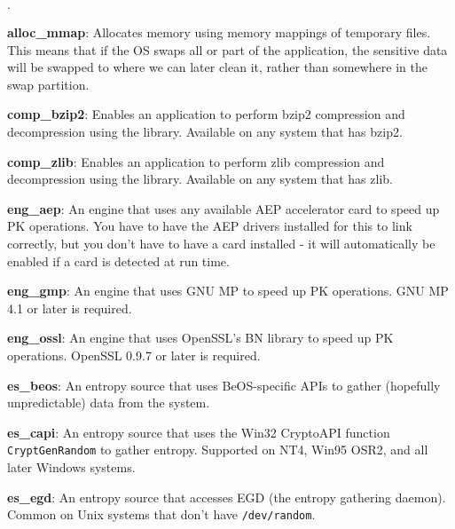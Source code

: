 \documentclass{article}
\begin{document}
\newcommand{\mod}[2]{\textbf{#1}: #2}

\begin{list}{$\cdot$}
  \item \mod{alloc\_mmap}{Allocates memory using memory mappings of temporary
         files. This means that if the OS swaps all or part of the application,
         the sensitive data will be swapped to where we can later clean it,
         rather than somewhere in the swap partition.}

  \item \mod{comp\_bzip2}{Enables an application to perform bzip2 compression
         and decompression using the library. Available on any system that has
         bzip2.}

  \item \mod{comp\_zlib}{Enables an application to perform zlib compression and
         decompression using the library. Available on any system that has
         zlib.}

  \item \mod{eng\_aep}{An engine that uses any available AEP accelerator card
         to speed up PK operations. You have to have the AEP drivers installed
         for this to link correctly, but you don't have to have a card
         installed - it will automatically be enabled if a card is detected at
         run time.}

  \item \mod{eng\_gmp}{An engine that uses GNU MP to speed up PK operations.
         GNU MP 4.1 or later is required.}

  \item \mod{eng\_ossl}{An engine that uses OpenSSL's BN library to speed up PK
         operations. OpenSSL 0.9.7 or later is required.}

  \item \mod{es\_beos}{An entropy source that uses BeOS-specific APIs to gather
         (hopefully unpredictable) data from the system.}

  \item \mod{es\_capi}{An entropy source that uses the Win32 CryptoAPI function
         \texttt{CryptGenRandom} to gather entropy. Supported on NT4, Win95
         OSR2, and all later Windows systems.}

  \item \mod{es\_egd}{An entropy source that accesses EGD (the entropy
         gathering daemon). Common on Unix systems that don't have
         \texttt{/dev/random}.}


\end{list}
\end{document}
